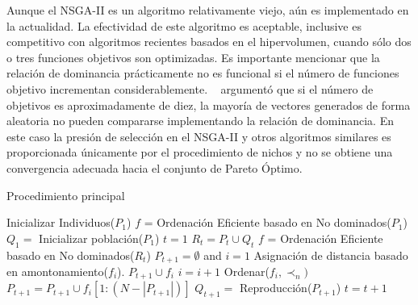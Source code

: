Aunque el NSGA-II es un algoritmo relativamente viejo, aún es implementado en la actualidad.
%
La efectividad de este algoritmo es aceptable, inclusive es competitivo con algoritmos recientes basados en el hipervolumen, cuando sólo dos o tres funciones objetivos son optimizadas.
%
Es importante mencionar que la relación de dominancia prácticamente no es funcional si el número de funciones objetivo incrementan considerablemente. ~\cite{Joel:MANYOBJECTIVE_ISHIBUCHI} argumentó que si el número de objetivos es aproximadamente de diez, la mayoría de vectores generados de forma aleatoria no pueden compararse implementando la relación de dominancia.
%
En este caso la presión de selección en el NSGA-II y otros algoritmos similares es proporcionada únicamente por el procedimiento de nichos y no se obtiene una convergencia adecuada hacia el conjunto de Pareto Óptimo.

\begin{algorithm}[H]
\scriptsize
	\caption{Procedimiento principal} 
	\label{alg:Main_Loop}
	\begin{algorithmic}[1] 
	\STATE Inicializar Individuos($P_1$)
	\STATE $f$ = Ordenación Eficiente basado en No dominados($P_1$) 
	\STATE $Q_{1} = $ Inicializar población($P_{1}$)
    \STATE $t=1$
		\STATE $R_t = P_t \cup Q_t$
		\STATE $f$ = Ordenación Eficiente basado en No dominados($R_t$)
		\STATE $P_{t+1} = \emptyset$ and $i=1$
			\STATE Asignación de distancia basado en amontonamiento($f_i$). 
			\STATE $P_{t+1} \cup f_i$
			\STATE $i = i+1$
		\ENDWHILE
		\STATE Ordenar($f_i, \prec_n)$ 
		\STATE $P_{t+1} = P_{t+1} \cup f_i[1:(N- |P_{t+1}|)]$
		\STATE $Q_{t+1} = $ Reproducción($P_{t+1}$) 
		\STATE $t=t+1$
	\ENDWHILE
	\end{algorithmic}
\end{algorithm}

